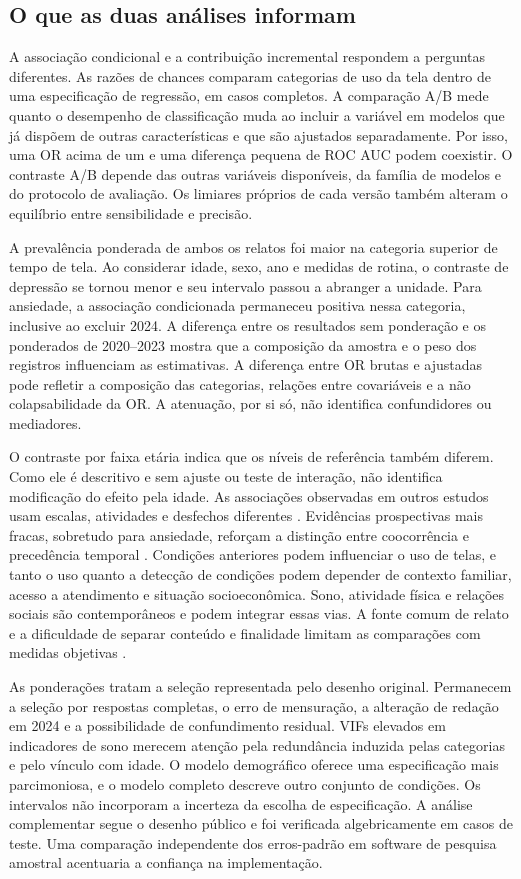 ﻿\documentclass[12pt]{article}
\begin{document}
\subsection{O que as duas análises informam}
A associação condicional e a contribuição incremental respondem a perguntas diferentes. As razões de chances comparam categorias de uso da tela dentro de uma especificação de regressão, em casos completos. A comparação A/B mede quanto o desempenho de classificação muda ao incluir a variável em modelos que já dispõem de outras características e que são ajustados separadamente. Por isso, uma OR acima de um e uma diferença pequena de ROC AUC podem coexistir. O contraste A/B depende das outras variáveis disponíveis, da família de modelos e do protocolo de avaliação. Os limiares próprios de cada versão também alteram o equilíbrio entre sensibilidade e precisão.

A prevalência ponderada de ambos os relatos foi maior na categoria superior de tempo de tela. Ao considerar idade, sexo, ano e medidas de rotina, o contraste de depressão se tornou menor e seu intervalo passou a abranger a unidade. Para ansiedade, a associação condicionada permaneceu positiva nessa categoria, inclusive ao excluir 2024. A diferença entre os resultados sem ponderação e os ponderados de 2020--2023 mostra que a composição da amostra e o peso dos registros influenciam as estimativas. A diferença entre OR brutas e ajustadas pode refletir a composição das categorias, relações entre covariáveis e a não colapsabilidade da OR. A atenuação, por si só, não identifica confundidores ou mediadores.

O contraste por faixa etária indica que os níveis de referência também diferem. Como ele é descritivo e sem ajuste ou teste de interação, não identifica modificação do efeito pela idade. As associações observadas em outros estudos usam escalas, atividades e desfechos diferentes \cite{boers2019,gao2024,paulich2021}. Evidências prospectivas mais fracas, sobretudo para ansiedade, reforçam a distinção entre coocorrência e precedência temporal \cite{tang2021,li2025}. Condições anteriores podem influenciar o uso de telas, e tanto o uso quanto a detecção de condições podem depender de contexto familiar, acesso a atendimento e situação socioeconômica. Sono, atividade física e relações sociais são contemporâneos e podem integrar essas vias. A fonte comum de relato e a dificuldade de separar conteúdo e finalidade limitam as comparações com medidas objetivas \cite{parry2021}.

As ponderações tratam a seleção representada pelo desenho original. Permanecem a seleção por respostas completas, o erro de mensuração, a alteração de redação em 2024 e a possibilidade de confundimento residual. VIFs elevados em indicadores de sono merecem atenção pela redundância induzida pelas categorias e pelo vínculo com idade. O modelo demográfico oferece uma especificação mais parcimoniosa, e o modelo completo descreve outro conjunto de condições. Os intervalos não incorporam a incerteza da escolha de especificação. A análise complementar segue o desenho público e foi verificada algebricamente em casos de teste. Uma comparação independente dos erros-padrão em software de pesquisa amostral acentuaria a confiança na implementação.
\end{document}

